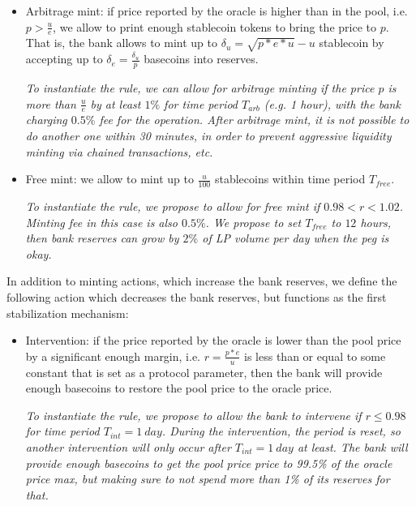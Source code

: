 \documentclass[a4paper,UKenglish,cleveref, autoref, thm-restate]{lipics-v2021}
\newcommand{\sct}{stablecoin}
\begin{document}
\begin{itemize}
  \item {Arbitrage mint:} if price reported by the oracle is higher than in the pool, i.e. $p > \frac{u}{e}$, we allow to print enough \sct{} tokens to bring the price to $p$. That is, the bank allows to mint up to $\delta_u = \sqrt{p*e*u}-u$ \sct{} by accepting up to $\delta_e = \frac{\delta_u}{p}$ basecoins into reserves. 
  
    \emph{To instantiate the rule, we can allow for arbitrage minting if the price $p$ is more than $\frac{u}{e}$ by at least $1\%$ for time period $T_{arb}$ (e.g. 1 hour), with the bank charging $0.5\%$ fee for the operation. After arbitrage mint, it is not possible to do another one within 30 minutes, in order to prevent aggressive liquidity minting via chained transactions, etc.}

  \item {Free mint:} we allow to mint up to $\frac{u}{100}$ \sct{}s within time period $T_{free}$. 

    \emph{To instantiate the rule, we propose to allow for free mint if $0.98 < r < 1.02$. Minting fee in this case is also $0.5\%$. We propose to set $T_{free}$ to $12$ hours, then bank reserves can grow by $2\%$ of LP volume per day when the peg is okay.}
\end{itemize}

In addition to minting actions, which increase the bank reserves, we define the following action which decreases the bank reserves, but functions as the first stabilization mechanism: 

\begin{itemize}
   \item{Intervention:} if the price reported by the oracle is lower than the pool price by a significant enough margin, i.e. $r = \frac{p*e}{u}$ is less than or equal to some constant that is set as a protocol parameter, then the bank will provide enough basecoins to restore the pool price to the oracle price.
   
   \emph{To instantiate the rule, we propose to allow the bank to intervene if $r \le 0.98$ for time period $T_{int} = 1 {\ day}$.
       During the intervention, the period is reset, so another intervention will only occur after $T_{int} = 1 {\ day}$ at least. The bank will provide enough basecoins to get the pool price
       price to 99.5\% of the oracle price max, but making sure to not spend more than 1\% of its reserves for that.}
\end{itemize}
\end{document}
